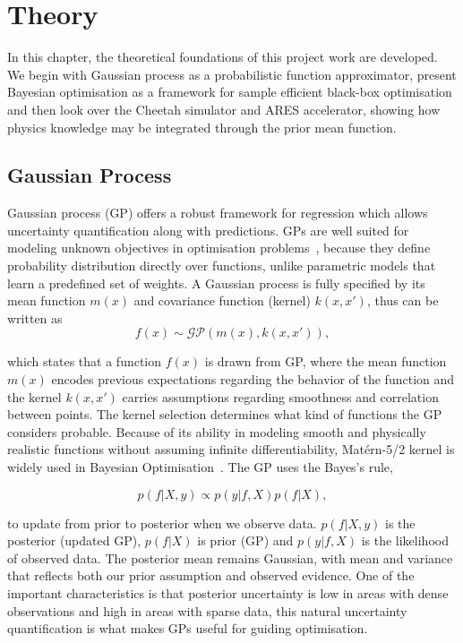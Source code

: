 \section{Theory}	\label{a:stil_en}

In this chapter, the theoretical foundations of this project work are developed. We begin with Gaussian process as a probabilistic function approximator, 
present Bayesian optimisation as a framework for sample efficient black-box optimisation and then look over the Cheetah simulator and 
ARES accelerator, showing how physics knowledge may be integrated through the prior mean function.


\subsection{Gaussian Process}

Gaussian process (GP) offers a robust framework for regression which allows uncertainty quantification along with predictions. GPs are well suited for 
modeling unknown objectives in optimisation problems~\cite{roussel2024bo}, because they define probability distribution directly over functions, unlike parametric models 
that learn a predefined set of weights. A Gaussian process is fully specified by its mean function $m(x)$ and covariance function (kernel) $k(x,x')$, thus can be written as
\begin{equation}
\label{gp_formula}
f(x) \sim \mathcal{GP}(m(x), k(x,x')),
\end{equation}

which states that a function $f(x)$ is drawn from GP, where the mean function $m(x)$ encodes previous expectations regarding the behavior of the 
function and the kernel $k(x,x')$ carries assumptions regarding smoothness and correlation between points. 
The kernel selection determines what kind of functions the GP considers probable. Because of its ability in modeling smooth and physically realistic functions without assuming 
infinite differentiability,  Mat\'ern-5/2 kernel is widely used in Bayesian Optimisation~\cite{roussel2024bo}. The GP uses the Bayes’s rule,

\begin{equation}
\label{eq_bayes_rule}
p(f | X, y) \propto p(y | f, X)p(f | X),
\end{equation}

to update from prior to posterior when we observe data. $p(f | X, y)$ is the posterior (updated GP), $p(f | X)$ is prior (GP) and $p(y | f, X)$ is the likelihood of observed data. The posterior mean remains Gaussian, with mean and variance that reflects both our prior assumption and observed evidence. 
One of the important characteristics is that posterior uncertainty is low in areas with dense observations and high in areas with sparse data, this natural uncertainty 
quantification is what makes GPs useful for guiding optimisation.

